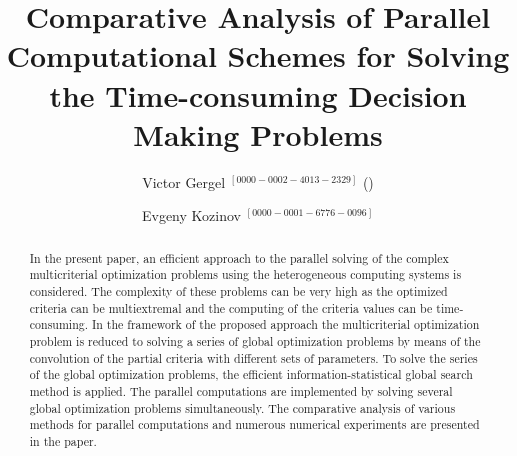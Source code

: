 \documentclass{svproc}
\def\orcidID#1{\unskip$^{[#1]}$}
\begin{document}
\mainmatter              %
%
\title{Comparative Analysis of Parallel Computational Schemes for 
Solving the Time-consuming Decision Making Problems}
%
%
\author{Victor Gergel \orcidID{0000-0002-4013-2329} (\Envelope) \and
Evgeny Kozinov \orcidID{0000-0001-6776-0096}}
%
%
%

\maketitle              %

\begin{abstract}
In the present paper, an efficient approach to the parallel solving of the complex multicriterial optimization problems using the heterogeneous computing systems is considered. The complexity of these problems can be very high as the optimized criteria can be multiextremal and the computing of the criteria values can be time-consuming.  In the framework of the proposed approach the multicriterial optimization problem is reduced to solving a series of global optimization problems by means of the convolution of the partial criteria with different sets of parameters. To solve the series of the global optimization problems, the efficient information-statistical global search method is applied.  The parallel computations are implemented by solving several global optimization problems simultaneously. The comparative analysis of various methods for parallel computations and numerous numerical experiments are presented in the paper.
\end{abstract}
%
\end{document}
